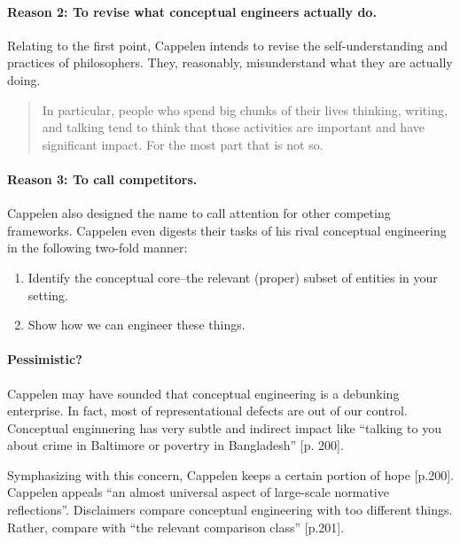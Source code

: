 \documentclass[
10pt, %
a4paper, %
twocolumn, %
landscape %
]{article}
\begin{document}
\paragraph{Reason 2: To revise what conceptual engineers actually do. }
Relating to the first point,
Cappelen intends to revise the self-understanding and practices of philosophers.
They, reasonably, misunderstand what they are actually doing.

\begin{quote}
  In particular, people who spend big chunks of their lives thinking, writing, and talking tend to think that those activities are important and have significant impact. For the most part that is not so.
\end{quote}

\paragraph{Reason 3: To call competitors.}
Cappelen also designed the name to call attention for other competing frameworks.
Cappelen even digests their tasks of his rival conceptual engineering in the following two-fold manner:

\begin{enumerate}
  \item Identify the conceptual core--the relevant (proper) subset of entities in your setting.
  \item Show how we can engineer these things.
\end{enumerate}

\paragraph{Pessimistic?}
Cappelen may have sounded that conceptual engineering is a debunking enterprise.
In fact, most of representational defects are out of our control.
Conceptual enginnering has very subtle and indirect impact like ``talking to you about crime in Baltimore or povertry in Bangladesh'' [p. 200].

Symphasizing with this concern, Cappelen keeps a certain portion of hope [p.200].
Cappelen appeals ``an almost universal aspect of large-scale normative reflections''.
Disclaimers compare conceptual engineering with too different things. Rather, compare with ``the relevant comparison class'' [p.201].
\end{document}
